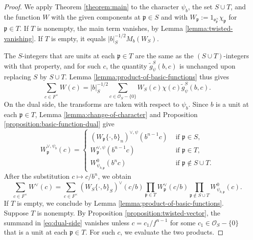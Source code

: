 \documentclass[reqno]{amsart}
\theoremstyle{plain}
\theoremstyle{definition}
\theoremstyle{itplain}
\numberwithin{equation}{section}
\numberwithin{theorem}{section}
\begin{document}
\begin{proof}
  We apply Theorem \ref{theorem:main} to the character $\psi_b$, the set $S \cup T$, and the function $W$ with the given components at $\mathfrak{p} \in S$ and with $W_{\mathfrak{p}} := 1_{\mathfrak{o}_{\mathfrak{p}}^\times} \chi_{\mathfrak{p}}$ for $\mathfrak{p} \in T$.  If $T$ is nonempty, the main term vanishes, by Lemma \ref{lemma:twisted-vanishing}.  If $T$ is empty, it equals $\lvert b \rvert_S^{-1/2} M_b(W_S)$.

  The $S$-integers that are units at each $\mathfrak{p} \in T$ are the same as the $(S \cup T)$-integers with that property, and for such $c$, the quantity $\tilde{g}_\psi^S(b, c)$ is unchanged upon replacing $S$ by $S \cup T$.  Lemma \ref{lemma:product-of-basic-functions} thus gives
  \begin{equation*}
    \sum_{c \in F^\times} W(c) = \lvert b \rvert_S^{-1/2} \sum_{c \in \mathcal{O}_S - \{0\}} W_S(c) \chi(c) \tilde{g}_\psi^S(b, c).
  \end{equation*}
  On the dual side, the transforms are taken with respect to $\psi_b$.  Since $b$ is a unit at each $\mathfrak{p} \in T$, Lemma \ref{lemma:change-of-character} and Proposition \ref{proposition:basic-function-dual} give
  \begin{equation*}
    W_{\mathfrak{p}}^{\vee,\psi_b}(c) =
    \begin{cases}
      (W_{\mathfrak{p}} \{\cdot, b\}_n)^{\vee,\psi}(b^{n-1} c)
      & \text{ if } \mathfrak{p} \in S, \\
      W_{\mathfrak{p}}^{\vee,\psi}(b^{n-1} c)
      & \text{ if } \mathfrak{p} \in T, \\
      W_{\psi_{b,\mathfrak{p}}}^0(b^n c)
      & \text{ if } \mathfrak{p} \notin S \cup T.
    \end{cases}
  \end{equation*}
  After the substitution $c \mapsto c / b^n$, we obtain
  \begin{equation}\label{eq:dual-side}
    \sum_{c \in F^\times} W^\vee(c) = \sum_{c \in F^\times}
    \left( W_S \{\cdot, b\}_S \right)^\vee (c / b)
    \prod_{\mathfrak{p} \in T} W_{\mathfrak{p}}^{\vee} (c / b)
    \prod_{\mathfrak{p} \notin S \cup T} W_{\psi_{b,\mathfrak{p}}}^0(c).
  \end{equation}
  If $T$ is empty, we conclude by Lemma \ref{lemma:product-of-basic-functions}.  Suppose $T$ is nonempty.  By Proposition \ref{proposition:twisted-vector}, the summand in \eqref{eq:dual-side} vanishes unless $c = c_1 / f^{n-1}$ for some $c_1 \in \mathcal{O}_S - \{0\}$ that is a unit at each $\mathfrak{p} \in T$.  For such $c$, we evaluate the two products.

\end{proof}
\end{document}
